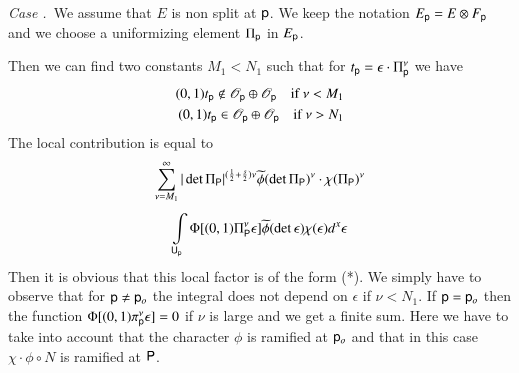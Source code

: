 \medskip
\noindent
{\em Case .\label{art2-caseII}}~We assume that $E$ is non split at $\mathsf{p}$. We keep the notation $E_{\mathsf{p}}=E\otimes F_{\mathsf{p}}$ and we choose a uniformizing element $\Pi_{\mathsf{p}}$ in $E_{\mathsf{p}}$.

Then we can find two constants $M_{1}<N_{1}$ such that for $t_{\mathsf{p}}=\epsilon \cdot \Pi^{\nu}_{\mathsf{p}}$ we have
\begin{align*}
(0,1)t_{\mathsf{p}}\not\in \mathscr{O}_{\mathsf{p}}\oplus \mathscr{O}_{\mathsf{p}}\quad \text{if~ } \nu<M_{1}\\
(0,1)t_{\mathsf{p}}\in \mathscr{O}_{\mathsf{p}}\oplus \mathscr{O}_{\mathsf{p}}\quad \text{if~ }\nu>N_{1}
\end{align*}
The local contribution is equal to
\begin{gather*}
\sum\limits^{\infty}_{\nu=M_{1}}|\det \Pi_{\mathsf{P}}|^{(\frac{1}{2}+\frac{s}{2})\nu}\widetilde{\phi}(\det \Pi_{\mathsf{P}})^{\nu}\cdot \chi(\Pi_{\mathsf{P}})^{\nu}\\[4pt]
\int\limits_{\mathsf{U}_{\mathsf{p}}}\Phi[(0,1)\Pi^{\nu}_{\mathsf{P}}\epsilon]\widetilde{\phi}(\det \epsilon)\chi(\epsilon)d^{x}\epsilon
\end{gather*}
Then it is obvious that this local factor is of the form (*). We simply have to observe that for $\mathsf{p}\neq \mathsf{p}_{o}$ the integral does not depend on $\epsilon$ if $\nu<N_{1}$. If $\mathsf{p}=\mathsf{p}_{o}$ then the function $\Phi[(0,1)\pi^{\nu}_{\mathsf{p}}\epsilon]=0$ if $\nu$ is large and we get a finite sum. Here we have to take into account that the character $\phi$ is ramified at $\mathsf{p}_{o}$ and that in this case $\chi\cdot \phi\circ N$ is ramified at $\mathsf{P}$.

